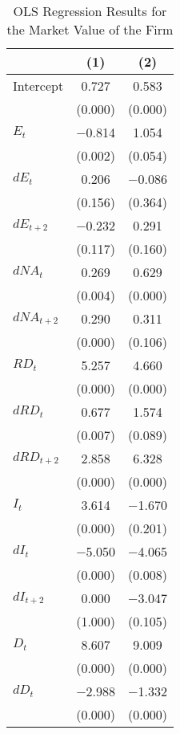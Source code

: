{
\begin{longtable}{l*{2}{c}}
\caption{OLS Regression Results for the Market Value of the Firm \label{tab:6}}\\
\toprule\endfirsthead\midrule\endhead\midrule\endfoot\endlastfoot
&\multicolumn{1}{c}{(1)}&\multicolumn{1}{c}{(2)}\\
\midrule
Intercept   &       0.727&       0.583\\
&     (0.000)&     (0.000)\\
\addlinespace
$ E_{t}$    &    $-$0.814&       1.054\\
&     (0.002)&     (0.054)\\
\addlinespace
$ dE_{t}$   &       0.206&    $-$0.086\\
&     (0.156)&     (0.364)\\
\addlinespace
$ dE_{t+2}$ &    $-$0.232&       0.291\\
&     (0.117)&     (0.160)\\
\addlinespace
$ dNA_{t}$  &       0.269&       0.629\\
&     (0.004)&     (0.000)\\
\addlinespace
$ dNA_{t+2}$&       0.290&       0.311\\
&     (0.000)&     (0.106)\\
\addlinespace
$ RD_{t}$   &       5.257&       4.660\\
&     (0.000)&     (0.000)\\
\addlinespace
$ dRD_{t}$  &       0.677&       1.574\\
&     (0.007)&     (0.089)\\
\addlinespace
$ dRD_{t+2}$&       2.858&       6.328\\
&     (0.000)&     (0.000)\\
\addlinespace
$ I_{t}$    &       3.614&    $-$1.670\\
&     (0.000)&     (0.201)\\
\addlinespace
$ dI_{t}$   &    $-$5.050&    $-$4.065\\
&     (0.000)&     (0.008)\\
\addlinespace
$ dI_{t+2}$ &       0.000&    $-$3.047\\
&     (1.000)&     (0.105)\\
\addlinespace
$ D_{t}$    &       8.607&       9.009\\
&     (0.000)&     (0.000)\\
\addlinespace
$ dD_{t}$   &    $-$2.988&    $-$1.332\\
&     (0.000)&     (0.000)\\

\end{longtable}}
